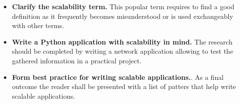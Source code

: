 \begin{itemize}
\item{\textbf{Clarify the scalability term.} This popular term requires to find a good definition as it frequently becomes  misunderstood or is used exchangeably with other terms.}
\item{\textbf{Write a Python application with scalability in mind.} The research should be completed by writing a network application allowing to test the gathered information in a practical project.}
\item{\textbf{Form best practice for writing scalable applications.}. As a final outcome the reader shall be presented with a list of patters that help write scalable applications.}
\end{itemize}
 
